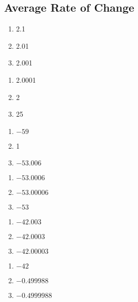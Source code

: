 \subsection*{Average Rate of Change}
\begin{multicols}{3}
\begin{enumerate}
\item 2.1
\item 2.01
\item 2.001
\end{enumerate}	\setcounter{Review}{\value{enumi}}
\end{multicols}
\begin{multicols}{3}
\begin{enumerate}	\setcounter{enumi}{\value{Review}} 
\item 2.0001
\item 2
\item 25
\end{enumerate}	\setcounter{Review}{\value{enumi}}
\end{multicols}
\begin{multicols}{3}
\begin{enumerate}	\setcounter{enumi}{\value{Review}} 
\item $-59$
\item 1
\item $-53.006$
\end{enumerate}	\setcounter{Review}{\value{enumi}}
\end{multicols}
\begin{multicols}{3}
\begin{enumerate}	\setcounter{enumi}{\value{Review}} 
\item $-53.0006$
\item $-53.00006$
\item $-53$
\end{enumerate}	\setcounter{Review}{\value{enumi}}
\end{multicols}
\begin{multicols}{3}
\begin{enumerate}	\setcounter{enumi}{\value{Review}} 
\item $-42.003$
\item $-42.0003$
\item $-42.00003$
\end{enumerate}	\setcounter{Review}{\value{enumi}}
\end{multicols}
\begin{multicols}{3}
\begin{enumerate}	\setcounter{enumi}{\value{Review}} 
\item $-42$
\item $-0.499988$
\item $-0.4999988$
\end{enumerate}	\setcounter{Review}{\value{enumi}}
\end{multicols}
